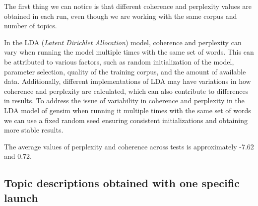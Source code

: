 \documentclass[10pt]{article} %
\begin{document}
	
	The first thing we can notice is that different coherence and perplexity values are obtained in each run, even though we are working with the same corpus and number of topics. 
		
	In the LDA (\textit{Latent Dirichlet Allocation}) model, coherence and perplexity can vary when running the model multiple times with the same set of words. This can be attributed to various factors, such as random initialization of the model, parameter selection, quality of the training corpus, and the amount of available data. Additionally, different implementations of LDA may have variations in how coherence and perplexity are calculated, which can also contribute to differences in results. To address the issue of variability in coherence and perplexity in the LDA model of gensim when running it multiple times with the same set of words we can use a fixed random seed ensuring consistent initializations and obtaining more stable results. 
	
	The average values of perplexity and coherence across tests is approximately -7.62 and 0.72.
	
	\subsection{Topic descriptions obtained with one specific launch}
	
\end{document}
